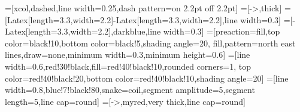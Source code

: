 \contourlength{0.4pt}

=[xcol,dashed,line width=0.25,dash pattern=on 2.2pt off 2.2pt]
=[->,thick] %
=[{Latex[length=3.3,width=2.2]}-{Latex[length=3.3,width=2.2]},line width=0.3]
=[-{Latex[length=3.3,width=2.2]},darkblue,line width=0.3]
=[preaction={fill,top color=black!10,bottom color=black!5,shading angle=20},
                    fill,pattern=north east lines,draw=none,minimum width=0.3,minimum height=0.6]
=[line width=0.6,red!30!black,fill=red!40!black!10,rounded corners=1,
                  top color=red!40!black!20,bottom color=red!40!black!10,shading angle=20]
=[line width=0.8,blue!7!black!80,snake=coil,segment amplitude=5,segment length=5,line cap=round]
\tikzset{>=latex} %
=[->,myred,very thick,line cap=round]
\def\tick#1#2{\draw[thick] (#1)++(#2:0.1) --++ (#2-180:0.2)}



